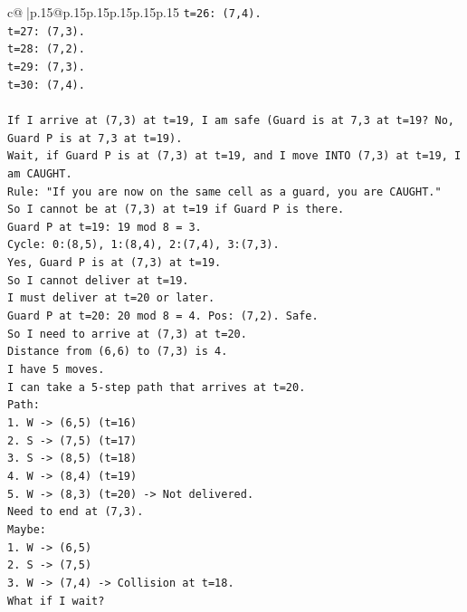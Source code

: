 \documentclass{article}
\begin{document}
{\begin{supertabular}{c@{$\;$}|p{.15\linewidth}@{}p{.15\linewidth}p{.15\linewidth}p{.15\linewidth}p{.15\linewidth}p{.15\linewidth}}
{{{\texttt{t=26: (7,4).} \\
\texttt{t=27: (7,3).} \\
\texttt{t=28: (7,2).} \\
\texttt{t=29: (7,3).} \\
\texttt{t=30: (7,4).} \\
\\ 
\texttt{If I arrive at (7,3) at t=19, I am safe (Guard is at 7,3 at t=19? No, Guard P is at 7,3 at t=19).} \\
\texttt{Wait, if Guard P is at (7,3) at t=19, and I move INTO (7,3) at t=19, I am CAUGHT.} \\
\texttt{Rule: "If you are now on the same cell as a guard, you are CAUGHT."} \\
\texttt{So I cannot be at (7,3) at t=19 if Guard P is there.} \\
\texttt{Guard P at t=19: 19 mod 8 = 3.} \\
\texttt{Cycle: 0:(8,5), 1:(8,4), 2:(7,4), 3:(7,3).} \\
\texttt{Yes, Guard P is at (7,3) at t=19.} \\
\texttt{So I cannot deliver at t=19.} \\
\texttt{I must deliver at t=20 or later.} \\
\texttt{Guard P at t=20: 20 mod 8 = 4. Pos: (7,2). Safe.} \\
\texttt{So I need to arrive at (7,3) at t=20.} \\
\texttt{Distance from (6,6) to (7,3) is 4.} \\
\texttt{I have 5 moves.} \\
\texttt{I can take a 5{-}step path that arrives at t=20.} \\
\texttt{Path:} \\
\texttt{1. W {-}> (6,5) (t=16)} \\
\texttt{2. S {-}> (7,5) (t=17)} \\
\texttt{3. S {-}> (8,5) (t=18)} \\
\texttt{4. W {-}> (8,4) (t=19)} \\
\texttt{5. W {-}> (8,3) (t=20) {-}> Not delivered.} \\
\texttt{Need to end at (7,3).} \\
\texttt{Maybe:} \\
\texttt{1. W {-}> (6,5)} \\
\texttt{2. S {-}> (7,5)} \\
\texttt{3. W {-}> (7,4) {-}> Collision at t=18.} \\
\texttt{What if I wait?} \\
}}}
\end{supertabular}}
\end{document}
